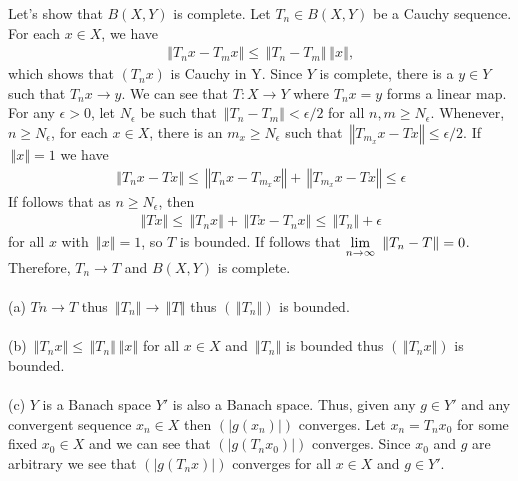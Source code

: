 \documentclass[10pt,a4paper]{report}
\newcommand{\NORM}[1]{\,\left \Vert #1 \right \Vert}
\begin{document}
\begin{enumerate}
	Let's show that $B(X,Y)$ is complete.  Let $T_n \in B(X,Y)$ be a Cauchy sequence.  For each $x \in X$, we have
	\begin{align*}
		\NORM{T_nx-T_mx} \le \NORM{T_n-T_m}\NORM{x},
	\end{align*}which shows that $(T_n x)$ is Cauchy in Y.  Since $Y$ is complete, there is a $y \in Y$ such that $T_nx \to y$.  We can see that $T: X\to Y$ where $T_nx =y$ forms a linear map.  For any $\epsilon >0$, let $N_\epsilon$ be such that $\NORM{T_n-T_m} < \epsilon/2$ for all $n,m \ge N_\epsilon$.  Whenever, $n \ge N_\epsilon$, for each $x \in X$, there is an $m_x \ge N_\epsilon$ such that $\NORM{T_{m_x}x-Tx} \le \epsilon/2$.  If $\NORM{x} = 1$ we have 
	\begin{align*}
		\NORM{T_nx-Tx} \le \NORM{T_nx-T_{m_x}x}+\NORM{T_{m_x}x-Tx} \le \epsilon
	\end{align*}If follows that as $n \ge N_\epsilon$, then 
	\begin{align*}
		\NORM{Tx}\le \NORM{T_nx} + \NORM{Tx-T_nx} \le \NORM{T_n} + \epsilon
	\end{align*}for all $x$ with $\NORM{x}=1$, so $T$ is bounded.  If follows that $\LIM{n\to \infty} \NORM{T_n-T} = 0$.  Therefore, $T_n \to T$ and $B(X,Y)$ is complete.\\
	\\
	(a) $Tn \to T$ thus $\NORM{T_n} \to \NORM{T}$ thus $(\NORM{T_n})$ is bounded.\\ \\
	(b) $\NORM{T_nx} \le \NORM{T_n}\NORM{x}$ for all $x \in X$ and $\NORM{T_n}$ is bounded thus $(\NORM{T_n x})$ is bounded.\\ \\
	(c) $Y$ is a Banach space $Y'$ is also a Banach space.  Thus, given any $g \in Y'$ and any convergent sequence $x_n \in X$ then $(|g(x_n)|)$ converges.  Let $x_n = T_nx_0$ for some fixed $x_0 \in X$ and we can see that $(|g(T_n x_0)|)$ converges.  Since $x_0$ and $g$ are arbitrary we see that $(|g(T_nx)|)$ converges for all $x \in X$ and $g \in Y'$.
\end{enumerate}
\end{document}
